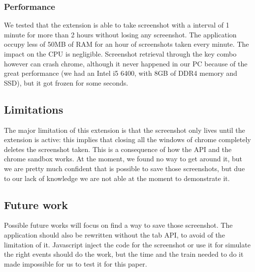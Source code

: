 \documentclass[12pt]{article}
\begin{document}
\begin{multicols}{2}
\subsubsection*{Performance}
We tested that the extension is able to take screenshot with a interval of 1 minute for more than 2 hours without losing any screenshot.
The application occupy less of 50MB of RAM for an hour of screenshots taken every minute. The impact on the CPU is negligible.
Screenshot retrieval through the key combo however can crash chrome, although it never happened in our PC because of the great performance (we had an Intel i5 6400, with 8GB of DDR4 memory and SSD), but it got frozen for some seconds.
\subsection*{Limitations}
The major limitation of this extension is that the screenshot only lives until the extension is active: this implies that closing all the windows of chrome completely deletes the screenshot taken.
This is a consequence of how the API and the chrome sandbox works. At the moment, we found no way to get around it, but we are pretty much confident that is possible to save those screenshots, but due to our lack of knowledge we are not able at the moment to demonstrate it.
\subsection*{Future work}
Possible future works will focus on find a way to save those screenshot.
The application should also be rewritten without the tab API, to avoid of the limitation of it.
Javascript inject the code for the screenshot or use it for simulate the right events should do the work, but the time and the train needed to do it made impossible for us to test it for this paper.

\end{multicols}
\end{document}
